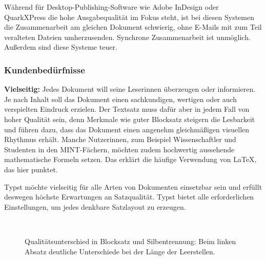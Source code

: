 \documentclass[11pt, a4paper]{article}
\newcommand{\gender}{\raisebox{-.25em}{*}}
\renewcommand{\glossary} {\marginsymbol{$\hookrightarrow$}}
\newcommand{\marginsymbol}[1] {\protect\marginsymbolhelper{#1}}
\newcommand{\marginsymbolhelper}[1] {\tabto*{-1cm}\makebox[0cm]{#1}\tabto*{\TabPrevPos}}
\begin{document}
Während für Desktop-Publishing-Software wie Adobe InDesign oder QuarkXPress die hohe Ausgabequalität im Fokus steht, ist bei diesen Systemen die Zusammenarbeit am gleichen Dokument schwierig, ohne E-Mails mit zum Teil veralteten Dateien umherzusenden. Synchrone Zusammenarbeit ist unmöglich. Außerdem sind diese Systeme teuer.

\subsubsection*{Kundenbedürfnisse}


\textbf{Vielseitig:} Jedes Dokument will seine Leser\gender{}innen überzeugen oder informieren. Je nach Inhalt soll das Dokument einen sachkundigen, wertigen oder auch verspielten Eindruck erzielen. Der Textsatz muss dafür aber in jedem Fall von hoher Qualität sein, denn Merkmale wie guter \glossary Blocksatz steigern die Lesbarkeit und führen dazu, dass das Dokument einen angenehm gleichmäßigen visuellen Rhythmus erhält. Manche Nutzer\gender{}innen, zum Beispiel Wissenschaftler und Studenten in den \glossary MINT-Fächern, möchten zudem hochwertig aussehende mathematische Formeln setzen. Das erklärt die häufige Verwendung von LaTeX, das hier punktet.

Typst möchte vielseitig für alle Arten von Dokumenten einsetzbar sein und erfüllt deswegen höchste Erwartungen an Satzqualität. Typst bietet alle erforderlichen Einstellungen, um jedes denkbare Satzlayout zu erzeugen.

\begin{figure}
    \centering
    ~ %
    \caption{Qualitätsunterschied in Blocksatz und Silbentrennung: 
  Beim linken Absatz deutliche Unterschiede bei der Länge der Leerstellen.}
\end{figure}
\end{document}
